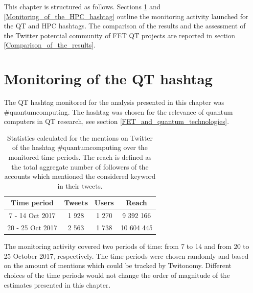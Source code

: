 This chapter is structured as follows. Sections \ref{Monitoring_of_the_QT_hashtag} and \ref{Monitoring_of_the_HPC_hashtag} outline the monitoring activity launched for the QT and HPC hashtags. The comparison of the results and the assessment of the Twitter potential community of FET QT projects are reported in section \ref{Comparison_of_the_results}. 

\section{Monitoring of the QT hashtag} \label{Monitoring_of_the_QT_hashtag}
The QT hashtag monitored for the analysis presented in this chapter was \#quantumcomputing. The hashtag was chosen for the relevance of quantum computers in QT research, see section \ref{FET_and_quantum_technologies}. 

\begin{table}[t]
 \begin{center}
  \begin{tabular}{cccc}
   \hline 
   \hline
   Time period & Tweets & Users & Reach \\ 
   \hline
   \hline
   7 - 14 Oct 2017 & 1 928 & 1 270 & 9 392 166  \\
   20 - 25 Oct 2017 & 2 563 & 1 738 & 10 604 445  \\
   \hline
   \hline
  \end{tabular}
 \end{center} 
 \caption{Statistics calculated for the mentions on Twitter of the hashtag \#quantumcomputing over the monitored time periods. The reach is defined as the total aggregate number of followers of the accounts which mentioned the considered keyword in their tweets.}
\label{Summary_QuantumComputing} 
\end{table}

The monitoring activity covered two periods of time: from 7 to 14 and from 20 to 25 October 2017, respectively. The time periods were chosen randomly and based on the amount of mentions which could be tracked by Twitonomy. Different choices of the time periods would not change the order of magnitude of the estimates presented in this chapter.

